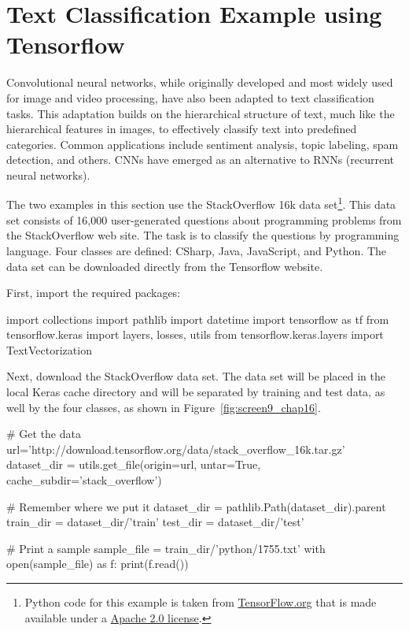 \section{Text Classification Example using Tensorflow}

Convolutional neural networks, while originally developed and most widely used for image and video processing, have also been adapted to text classification tasks. This adaptation builds on the hierarchical structure of text, much like the hierarchical features in images, to effectively classify text into predefined categories. Common applications include sentiment analysis, topic labeling, spam detection, and others. CNNs have emerged as an alternative to RNNs (recurrent neural networks).

The two examples in this section use the StackOverflow 16k data set\footnote{Python code for this example is taken from \href{https://www.tensorflow.org/tutorials/load_data/text}{TensorFlow.org} that is made available under a \href{https://www.apache.org/licenses/LICENSE-2.0}{Apache 2.0 license}.}. This data set consists of 16,000 user-generated questions about programming problems from the StackOverflow web site. The task is to classify the questions by programming language. Four classes are defined: CSharp, Java, JavaScript, and Python. The data set can be downloaded directly from the Tensorflow website.

First, import the required packages:

\begin{pythoncode}
import collections
import pathlib
import datetime
import tensorflow as tf
from tensorflow.keras import layers, losses, utils
from tensorflow.keras.layers import TextVectorization
\end{pythoncode}

Next, download the StackOverflow data set. The data set will be placed in the local Keras cache directory and will be separated by training and test data, as well by the four classes, as shown in Figure~\ref{fig:screen9_chap16}.

\begin{pythoncode}
# Get the data
url='http://download.tensorflow.org/data/stack_overflow_16k.tar.gz'
dataset_dir = utils.get_file(origin=url, untar=True,
        cache_subdir='stack_overflow')

# Remember where we put it
dataset_dir = pathlib.Path(dataset_dir).parent
train_dir = dataset_dir/'train'
test_dir = dataset_dir/'test'

# Print a sample
sample_file = train_dir/'python/1755.txt'
with open(sample_file) as f:
  print(f.read())
\end{pythoncode}

